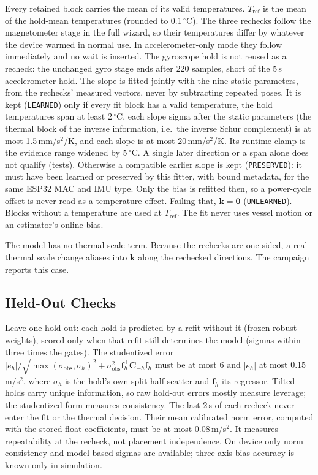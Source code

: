 \documentclass[conference]{IEEEtran}
\begin{document}
    Every retained block carries the mean of its valid temperatures.
    $T_\text{ref}$ is the mean of the hold-mean temperatures (rounded to
    0.1\,$^\circ$C). The three rechecks follow the magnetometer stage in
    the full wizard, so their temperatures differ by
    whatever the device warmed in normal use. In accelerometer-only mode
    they follow immediately and no wait is inserted. The gyroscope hold is
    not reused as a recheck: the unchanged gyro stage ends after 220
    samples, short of the 5\,s accelerometer hold. The slope is fitted
    jointly with the nine static parameters, from the rechecks' measured
    vectors, never by subtracting repeated poses. It is kept
    (\texttt{LEARNED}) only if every fit block has a valid temperature, the
    hold temperatures span at least 2\,$^\circ$C, each slope sigma after the
    static parameters (the thermal block of the inverse information, i.e.\
    the inverse Schur complement) is at most 1.5\,mm/s$^2$/K, and each
    slope is at most 20\,mm/s$^2$/K. Its runtime clamp is the evidence range
    widened by 5\,$^\circ$C. A single later direction or a span alone does
    not qualify (tests). Otherwise a compatible earlier slope is kept
    (\texttt{PRESERVED}): it must have been learned or preserved by this
    fitter, with bound metadata, for the same ESP32 MAC and IMU type. Only
    the bias is refitted then, so a power-cycle offset is never read as a
    temperature effect. Failing that, $\mathbf{k}=\mathbf{0}$
    (\texttt{UNLEARNED}). Blocks without a temperature are used at
    $T_\text{ref}$. The fit never uses vessel motion or an estimator's
    online bias.

    The model has no thermal scale term. Because the rechecks are
    one-sided, a real thermal scale change aliases into $\mathbf{k}$ along
    the rechecked directions. The campaign reports this case.

    \subsection{Held-Out Checks}

    Leave-one-hold-out: each hold is predicted by a refit without it (frozen
    robust weights), scored only when that refit still determines the model
    (sigmas within three times the gates). The studentized error
    $|e_h| / \sqrt{\max(\sigma_\text{obs}, \sigma_h)^2 +
    \sigma_\text{obs}^2 \mathbf{f}_h^\top \mathbf{C}_{-h}\mathbf{f}_h}$ must
    be at most 6 and $|e_h|$ at most 0.15\,m/s$^2$, where $\sigma_h$ is the
    hold's own split-half scatter and $\mathbf{f}_h$ its regressor. Tilted
    holds carry unique information, so raw hold-out errors mostly measure
    leverage; the studentized form measures consistency. The last 2\,s of
    each recheck never enter the fit or the thermal decision. Their mean
    calibrated norm error, computed with the stored float coefficients, must
    be at most 0.08\,m/s$^2$. It measures repeatability at the recheck, not
    placement independence. On device only norm consistency and model-based
    sigmas are available; three-axis bias accuracy is known only in
    simulation.
\end{document}
